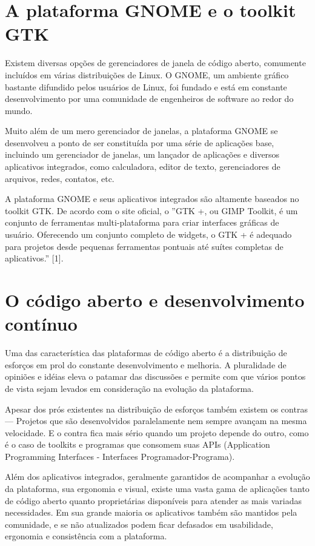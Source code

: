 \section{A plataforma GNOME e o toolkit GTK}

Existem diversas opções de gerenciadores de janela de código aberto, comumente
incluídos em várias distribuições de Linux. O GNOME, um ambiente gráfico
bastante difundido pelos usuários de Linux, foi fundado e está em constante
desenvolvimento por uma comunidade de engenheiros de software ao redor do mundo.

Muito além de um mero gerenciador de janelas, a plataforma GNOME se desenvolveu
a ponto de ser constituída por uma série de aplicações base, incluindo um
gerenciador de janelas, um lançador de aplicações e diversos aplicativos
integrados, como calculadora, editor de texto, gerenciadores de arquivos, redes,
contatos, etc.

A plataforma GNOME e seus aplicativos integrados são altamente baseados no
toolkit GTK. De acordo com o site oficial, o ”GTK +, ou GIMP Toolkit, é um
conjunto de ferramentas multi-plataforma para criar interfaces gráficas de
usuário. Oferecendo um conjunto completo de widgets, o GTK + é adequado para
projetos desde pequenas ferramentas pontuais até suítes completas de
aplicativos.”  [1].

\section{O código aberto e desenvolvimento contínuo}

Uma das característica das plataformas de código aberto é a distribuição de
esforços em prol do constante desenvolvimento e melhoria. A pluralidade de
opiniões e idéias eleva o patamar das discussões e permite com que vários pontos
de vista sejam levados em consideração na evolução da plataforma.

Apesar dos prós existentes na distribuição de esforços também existem os contras
— Projetos que são desenvolvidos paralelamente nem sempre avançam na mesma
velocidade. E o contra fica mais sério quando um projeto depende do outro, como
é o caso de toolkits e programas que consomem suas APIs (Application Programming
Interfaces - Interfaces Programador-Programa).

Além dos aplicativos integrados, geralmente garantidos de acompanhar a evolução
da plataforma, sua ergonomia e visual, existe uma vasta gama de aplicações tanto
de código aberto quanto proprietárias disponíveis para atender as mais variadas
necessidades. Em sua grande maioria os aplicativos também são mantidos pela
comunidade, e se não atualizados podem ficar defasados em usabilidade, ergonomia
e consistência com a plataforma.

